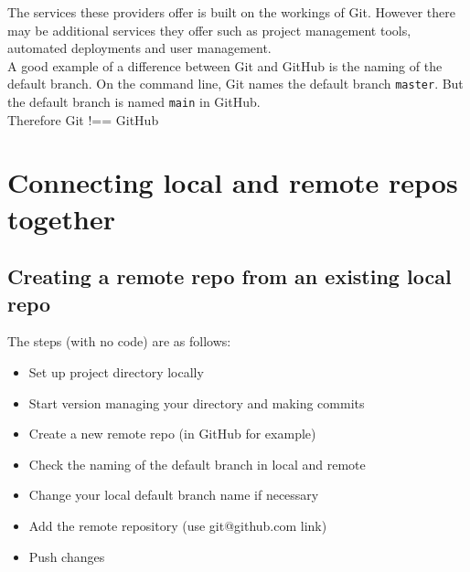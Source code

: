 The services these providers offer is built on the workings of Git. However there may be additional services they offer such as project management tools, automated deployments and user management.
\\

A good example of a difference between Git and GitHub is the naming of the default branch. On the command line, Git names the default branch \texttt{master}. But the default branch is named \texttt{main} in GitHub.
\\

Therefore Git !== GitHub 
\\


\section{Connecting local and remote repos together}

\subsection{Creating a remote repo from an existing local repo}

The steps (with no code) are as follows:

\begin{itemize}
    \item Set up project directory locally
    \item Start version managing your directory and making commits
	\item Create a new remote repo (in GitHub for example)
	\item Check the naming of the default branch in local and remote
	\item Change your local default branch name if necessary
    \item Add the remote repository (use git@github.com link)
    \item Push changes
\end{itemize}

